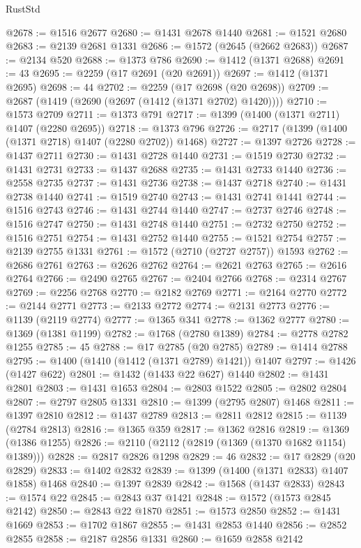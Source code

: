 \begin{lexlean}{RustStd}
\begin{coremodule}
@2678 := @1516 @2677
@2680 := @1431 @2678 @1440
@2681 := @1521 @2680
@2683 := @2139 @2681 @1331
@2686 := @1572 (@2645 (@2662 @2683))
@2687 := @2134 @520
@2688 := @1373 @786
@2690 := @1412 (@1371 @2688)
@2691 := 43
@2695 := @2259 (@17 @2691 (@20 @2691))
@2697 := @1412 (@1371 @2695)
@2698 := 44
@2702 := @2259 (@17 @2698 (@20 @2698))
@2709 := @2687 (@1419 (@2690 (@2697 (@1412 (@1371 @2702) @1420))))
@2710 := @1573 @2709
@2711 := @1373 @791
@2717 := @1399 (@1400 (@1371 @2711) @1407 (@2280 @2695))
@2718 := @1373 @796
@2726 := @2717 (@1399 (@1400 (@1371 @2718) @1407 (@2280 @2702)) @1468)
@2727 := @1397 @2726
@2728 := @1437 @2711
@2730 := @1431 @2728 @1440
@2731 := @1519 @2730
@2732 := @1431 @2731
@2733 := @1437 @2688
@2735 := @1431 @2733 @1440
@2736 := @2558 @2735
@2737 := @1431 @2736
@2738 := @1437 @2718
@2740 := @1431 @2738 @1440
@2741 := @1519 @2740
@2743 := @1431 @2741 @1441
@2744 := @1516 @2743
@2746 := @1431 @2744 @1440
@2747 := @2737 @2746
@2748 := @1516 @2747
@2750 := @1431 @2748 @1440
@2751 := @2732 @2750
@2752 := @1516 @2751
@2754 := @1431 @2752 @1440
@2755 := @1521 @2754
@2757 := @2139 @2755 @1331
@2761 := @1572 (@2710 (@2727 @2757)) @1593
@2762 := @2686 @2761
@2763 := @2626 @2762
@2764 := @2621 @2763
@2765 := @2616 @2764
@2766 := @2490 @2765
@2767 := @2404 @2766
@2768 := @2314 @2767
@2769 := @2256 @2768
@2770 := @2182 @2769
@2771 := @2164 @2770
@2772 := @2144 @2771
@2773 := @2133 @2772
@2774 := @2131 @2773
@2776 := @1139 (@2119 @2774)
@2777 := @1365 @341
@2778 := @1362 @2777
@2780 := @1369 (@1381 @1199)
@2782 := @1768 (@2780 @1389)
@2784 := @2778 @2782 @1255
@2785 := 45
@2788 := @17 @2785 (@20 @2785)
@2789 := @1414 @2788
@2795 := @1400 (@1410 (@1412 (@1371 @2789) @1421)) @1407
@2797 := @1426 (@1427 @622)
@2801 := @1432 (@1433 @22 @627) @1440
@2802 := @1431 @2801
@2803 := @1431 @1653
@2804 := @2803 @1522
@2805 := @2802 @2804
@2807 := @2797 @2805 @1331
@2810 := @1399 (@2795 @2807) @1468
@2811 := @1397 @2810
@2812 := @1437 @2789
@2813 := @2811 @2812
@2815 := @1139 (@2784 @2813)
@2816 := @1365 @359
@2817 := @1362 @2816
@2819 := @1369 (@1386 @1255)
@2826 := @2110 (@2112 (@2819 (@1369 (@1370 @1682 @1154) @1389)))
@2828 := @2817 @2826 @1298
@2829 := 46
@2832 := @17 @2829 (@20 @2829)
@2833 := @1402 @2832
@2839 := @1399 (@1400 (@1371 @2833) @1407 @1858) @1468
@2840 := @1397 @2839
@2842 := @1568 (@1437 @2833)
@2843 := @1574 @22
@2845 := @2843 @37 @1421
@2848 := @1572 (@1573 @2845 @2142)
@2850 := @2843 @22 @1870
@2851 := @1573 @2850
@2852 := @1431 @1669
@2853 := @1702 @1867
@2855 := @1431 @2853 @1440
@2856 := @2852 @2855
@2858 := @2187 @2856 @1331
@2860 := @1659 @2858 @2142

\end{coremodule}
\end{lexlean}
